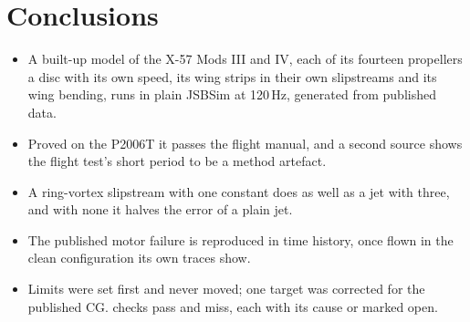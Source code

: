 \documentclass[10pt,a4paper,twocolumn]{article}
\begin{document}
\section{Conclusions}\label{sec:concl}
\begin{itemize}
\item A built-up model of the X-57 Mods III and IV, each of its fourteen propellers a disc with its own speed, its wing strips in their own slipstreams and its wing bending, runs in plain JSBSim at 120\,Hz, generated from published data.
\item Proved on the P2006T it passes the flight manual, and a second source shows the flight test's short period to be a method artefact.
\item A ring-vortex slipstream with one constant does as well as a jet with three, and with none it halves the error of a plain jet.
\item The published motor failure is reproduced in time history, once flown in the clean configuration its own traces show.
\item Limits were set first and never moved; one target was corrected for the published CG. \Npass{} checks pass and \Nmiss{} miss, each with its cause or marked open.
\end{itemize}
\end{document}
